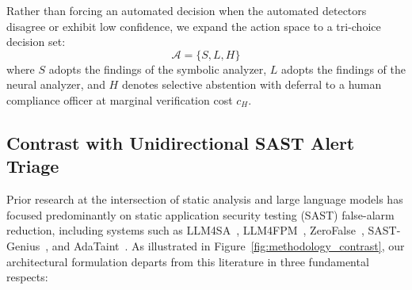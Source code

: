 Rather than forcing an automated decision when the automated detectors disagree or exhibit low confidence, we expand the action space to a tri-choice decision set:
\begin{equation}
\mathcal{A} = \{S, L, H\}
\end{equation}
where $S$ adopts the findings of the symbolic analyzer, $L$ adopts the findings of the neural analyzer, and $H$ denotes selective abstention with deferral to a human compliance officer at marginal verification cost $c_H$.

\subsection{Contrast with Unidirectional SAST Alert Triage}
\label{sec:methodology:contrast}

Prior research at the intersection of static analysis and large language models has focused predominantly on static application security testing (SAST) false-alarm reduction, including systems such as LLM4SA~\cite{wen2024automatically}, LLM4FPM~\cite{chen2024llm4fpm}, ZeroFalse~\cite{iranmanesh2025zerofalse}, SAST-Genius~\cite{agrawal2025sastgenius}, and AdaTaint~\cite{lin2025adataint}. As illustrated in Figure~\ref{fig:methodology_contrast}, our architectural formulation departs from this literature in three fundamental respects:

